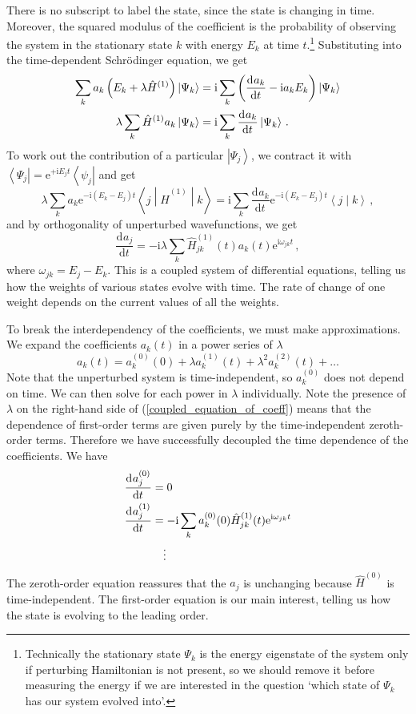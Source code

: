 \documentclass{article}
\theoremstyle{plain}\theoremheaderfont{\normalfont\itshape}\theorembodyfont{\rmfamily}\theoremseparator{.}\newtheorem*{rem}{Remark}\newtheorem*{ex}{Example}\newtheorem*{proof}{Proof}\newtheorem*{altp}{Alternative proof}
\theoremstyle{plain}\theoremheaderfont{\normalfont\bfseries}\theorembodyfont{\rmfamily}\theoremseparator{.}\newtheorem{thm}{Theorem}[section]\newtheorem{lem}[thm]{Lemma}\newtheorem{prop}[thm]{Proposition}\newtheorem*{cor}{Corollary}\newtheorem{defn}[thm]{Definition}\newtheorem{clm}[thm]{Claim}\newtheorem{clminproof}{Claim}
\theoremstyle{break}\theoremheaderfont{\normalfont\itshape}\theorembodyfont{\rmfamily}\theoremseparator{.\medskip}\newtheorem*{proofskip}{Proof}\newtheorem*{exs}{Examples}\newtheorem*{rems}{Remarks}
\theoremstyle{break}\theoremheaderfont{\normalfont\bfseries}\theorembodyfont{\rmfamily}\theoremseparator{.\medskip}\newtheorem{lemskip}[thm]{Lemma}\newtheorem{defnskip}[thm]{Definition}\newtheorem{propskip}[thm]{Proposition}\newtheorem{thmskip}[thm]{Theorem}
\numberwithin{equation}{section}
\newcommand{\ii}{\mathrm{i}}
\newcommand{\ee}{\mathrm{e}}
\newcommand{\dv}[3][]{\frac{\mathrm{d}^{#1} #2}{{\mathrm{d} #3}^{#1}}}
\newcommand{\bra}[1]{\left\langle #1 \right|}
\newcommand{\ket}[1]{\left| #1 \right\rangle}
\newcommand{\braket}[2]{\left\langle #1 \middle| #2 \right\rangle}
\newcommand{\mel}[3]{\left\langle #1 \middle| #2 \middle| #3 \right\rangle}
\begin{document}
    There is no subscript to label the state, since the state is changing in time. Moreover, the squared modulus of the coefficient is the probability of observing the system in the stationary state \(k\) with energy \(E_k\) at time \(t\).\footnote{Technically the stationary state \(\Psi_k\) is the energy eigenstate of the system only if perturbing Hamiltonian is not present, so we should remove it before measuring the energy if we are interested in the question `which state of \(\Psi_k\) has our system evolved into'.} Substituting into the time-dependent Schr\"{o}dinger equation, we get
    \begin{align}
        \sum_k a_k\left(E_k+\lambda\hat{H}^{(1)}\right)\ket{\Psi_k}&=\ii\sum_k\left(\dv{a_k}{t}-\ii a_kE_k\right)\ket{\Psi_k}\notag\\
        \lambda\sum_k\hat{H}^{(1)}a_k\ket{\Psi_k}&=\ii\sum_k\dv{a_k}{t}\ket{\Psi_k}\,.
    \end{align}
    To work out the contribution of a particular \(\ket{\Psi_j}\), we contract it with \(\bra{\Psi_j}=\ee^{+\ii E_j t}\bra{\psi_j}\) and get
    \begin{equation}
        \lambda\sum_k a_k \ee^{-\ii(E_k-E_j)t}\mel{j}{\hat{H}^{(1)}}{k}=\ii\sum_k\dv{a_k}{t}\ee^{-\ii(E_k-E_j)t}\braket{j}{k}\,,
    \end{equation}
    and by orthogonality of unperturbed wavefunctions, we get
    \begin{equation}\label{coupled_equation_of_coeff}
        \dv{a_j}{t}=-\ii\lambda\sum_k \hat{H}_{jk}^{(1)}(t)a_k(t) \ee^{\ii\omega_{jk}t}\,,
    \end{equation}
    where \(\omega_{jk}=E_j-E_k\). This is a coupled system of differential equations, telling us how the weights of various states evolve with time. The rate of change of one weight depends on the current values of all the weights.

    To break the interdependency of the coefficients, we must make approximations. We expand the coefficients \(a_k(t)\) in a power series of \(\lambda\)
    \begin{equation}
        a_k(t)=a_k^{(0)}(0)+\lambda a_k^{(1)}(t)+\lambda^2a_k^{(2)}(t)+\dots
    \end{equation}
    Note that the unperturbed system is time-independent, so \(a_k^{(0)}\) does not depend on time. We can then solve for each power in \(\lambda\) individually. Note the presence of \(\lambda\) on the right-hand side of (\ref{coupled_equation_of_coeff}) means that the dependence of first-order terms are given purely by the time-independent zeroth-order terms. Therefore we have successfully decoupled the time dependence of the coefficients. We have
    \begin{align}
        \dv{a_j^{(0)}}{t}&= 0\\
        \dv{a_j^{(1)}}{t}&=-\ii\sum_k a_k^{(0)}(0)\hat{H}_{jk}^{(1)}(t)\ee^{\ii\omega_{jk}t}\\
        &\quad\vdots\notag
    \end{align}
    The zeroth-order equation reassures that the \(a_j\) is unchanging because \(\hat{H}^{(0)}\) is time-independent. The first-order equation is our main interest, telling us how the state is evolving to the leading order.
\end{document}
